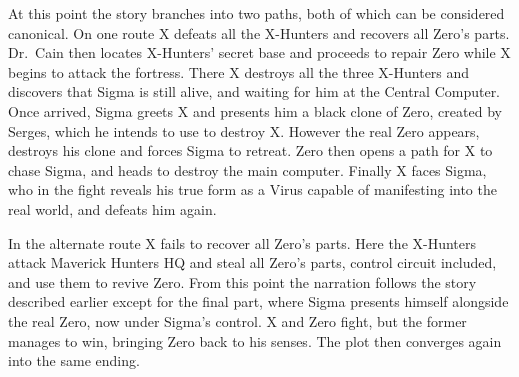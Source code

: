 At this point the story branches into two paths, both of which can be considered canonical. On one route X defeats all the X-Hunters and recovers all Zero's parts. Dr.~Cain then locates X-Hunters' secret base and proceeds to repair  Zero while X begins to attack the fortress. There X destroys all the three X-Hunters and discovers that Sigma is still alive, and waiting for him at the Central Computer. Once arrived, Sigma greets X and presents him a black clone of Zero, created by Serges, which he intends to use to destroy X. However the real Zero appears, destroys his clone and forces Sigma to retreat. Zero then opens a path for X to chase Sigma, and heads to destroy the main computer. Finally X faces Sigma, who in the fight reveals his true form as a Virus capable of manifesting into the real world, and defeats him again.

In the alternate route X fails to recover all Zero's parts. Here the X-Hunters attack Maverick Hunters HQ and steal all Zero's parts, control circuit included, and use them to revive Zero. From this point the narration follows the story described earlier except for the final part, where Sigma presents himself alongside the real Zero, now under Sigma's control. X and Zero fight, but the former manages to win, bringing Zero back to his senses. The plot then converges again into the same ending.



